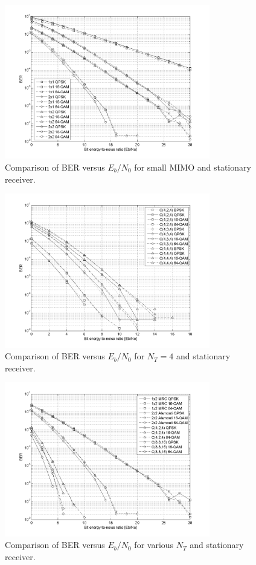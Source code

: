 \begin{figure}[p]
  \centering
  \includegraphics[width=0.8\textwidth]{images/result1.png}
  \caption{Comparison of BER versus $E_b/N_0$ for small MIMO and stationary receiver.}
  \label{fig:result1}
\end{figure}

\begin{figure}[p]
  \centering
  \includegraphics[width=0.8\textwidth]{images/result2.png}
  \caption{Comparison of BER versus $E_b/N_0$ for $N_T=4$ and stationary receiver.}
  \label{fig:result2}
\end{figure}

\begin{figure}[p]
  \centering
  \includegraphics[width=0.8\textwidth]{images/result3.png}
  \caption{Comparison of BER versus $E_b/N_0$ for various $N_T$ and stationary receiver.}
  \label{fig:result3}
\end{figure}

